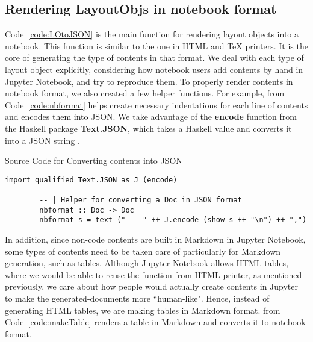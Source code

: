 \subsection{Rendering LayoutObjs in notebook format}
Code~\ref{code:LOtoJSON} is the main function for rendering layout objects into 
a notebook. This function is similar to the one in HTML and TeX printers. It is 
the core of generating the type of contents in that format. We deal with each 
type of layout object explicitly, considering how notebook users add contents 
by hand in Jupyter Notebook, and try to reproduce them. To properly render 
contents in notebook format, we also created a few helper functions. For 
example,  from Code~\ref{code:nbformat} helps create necessary 
indentations for each line of contents and encodes them into JSON. We take 
advantage of the \textbf{encode} function from the Haskell package 
\textbf{Text.JSON}, which takes a Haskell value and converts it into a JSON 
string \cite{textdotjosn}. 

\begin{listing}[h]
	\caption{Source Code for Converting contents into JSON}
	\label{code:nbformat}
	\begin{lstlisting}[language=haskell1]
		import qualified Text.JSON as J (encode) 
		
		-- | Helper for converting a Doc in JSON format
		nbformat :: Doc -> Doc
		nbformat s = text ("    " ++ J.encode (show s ++ "\n") ++ ",")
	\end{lstlisting}
\end{listing}

In addition, since non-code contents are built in Markdown in Jupyter Notebook, 
some types of contents need to be taken care of particularly for Markdown 
generation, such as tables. Although Jupyter Notebook allows HTML tables, where 
we would be able to reuse the function from HTML printer, as mentioned 
previously, we care about how people would actually create contents in Jupyter 
to make the generated-documents more ``human-like". Hence, instead of 
generating HTML tables, we are making tables in Markdown format. 
 from Code~\ref{code:makeTable} renders a table in Markdown 
and converts it to notebook format.

